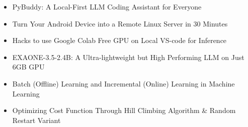 

{\fontsize{9pt}{11pt}\selectfont\bodyfont\color{text}
\begin{itemize}[leftmargin=*]

\item PyBuddy: A Local-First LLM Coding Assistant for Everyone
\href{https://taufiq-ai.github.io/blog/pybuddy-local-ai-code-assistant.html}{\faLink}

\item Turn Your Android Device into a Remote Linux Server in 30 Minutes
\href{https://taufiq-ai.github.io/blog/turn-android-device-into-remote-linux-server-in-30-minutes.html}{\faLink}

\item Hacks to use Google Colab Free GPU on Local VS-code for Inference
\href{https://taufiq-ai.github.io/blog/google-colab-free-gpu-on-local-device-for-inference.html}{\faLink}

\item EXAONE-3.5-2.4B: A Ultra-lightweight but High Performing LLM on Just 6GB GPU
\href{https://taufiq-ai.github.io/blog/exaone-3-5-2-4b-pre-trained.html}{\faLink}

\item Batch (Offline) Learning and Incremental (Online) Learning in Machine Learning
\href{https://www.linkedin.com/pulse/batch-offline-learning-incremental-online-machine-tusar-stmieee/}{\faLink}




\item Optimizing Cost Function Through Hill Climbing Algorithm \& Random Restart Variant
\href{https://aistickynotes.blogspot.com/2021/04/7-optimization-hill-climbing-algorithm.html}{\faLink}

\vspace{5em}

\end{itemize}
}
